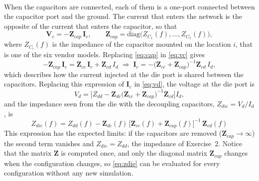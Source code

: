\noindent\\ When the capacitors are connected, each of them is a one-port connected between the capacitor port and the ground. The current that enters
the network is the opposite of the current that enters the capacitor, so that
\begin{equation}
  \mathbf{V}_c = -\mathbf{Z}_{cap}\,\mathbf{I}_c,
  \qquad
  \mathbf{Z}_{cap} = \mathrm{diag}\big(Z_{C_1}(f),\dots,Z_{C_5}(f)\big),
  \label{eq:cap}
\end{equation}
where $Z_{C_i}(f)$ is the impedance of the capacitor mounted on the location $i$, that is one of the six vendor models. Replacing \eqref{eq:cap} in
\eqref{eq:vc} gives
\begin{equation}
  -\mathbf{Z}_{cap}\,\mathbf{I}_c = \mathbf{Z}_{cc}\,\mathbf{I}_c + \mathbf{Z}_{cd}\,I_d
  \;\Longrightarrow\;
  \mathbf{I}_c = -\big(\mathbf{Z}_{cc} + \mathbf{Z}_{cap}\big)^{-1}\mathbf{Z}_{cd}\,I_d,
\end{equation}
which describes how the current injected at the die port is shared between the capacitors. Replacing this expression of $\mathbf{I}_c$ in \eqref{eq:vd}, the voltage
at the die port is
\begin{equation}
  V_d = \Big[ Z_{dd} - \mathbf{Z}_{dc}\big(\mathbf{Z}_{cc} + \mathbf{Z}_{cap}\big)^{-1}\mathbf{Z}_{cd} \Big] I_d ,
\end{equation}
and the impedance seen from the die with the decoupling capacitors, $Z_{die} = V_d/I_d$, is
\begin{equation}
  \boxed{\,Z_{die}(f) = Z_{dd}(f) - \mathbf{Z}_{dc}(f)\,\big[\mathbf{Z}_{cc}(f) + \mathbf{Z}_{cap}(f)\big]^{-1}\,\mathbf{Z}_{cd}(f)\,}
  \label{eq:zdie}
\end{equation}
This expression has the expected limits: if the capacitors are removed ($\mathbf{Z}_{cap}\to\infty$) the second term vanishes and $Z_{die} = Z_{dd}$, the
impedance of Exercise~2. Notice that the matrix $\mathbf{Z}$ is computed once, and only the diagonal matrix $\mathbf{Z}_{cap}$ changes when the configuration
changes, so \eqref{eq:zdie} can be evaluated for every configuration without any new simulation.

